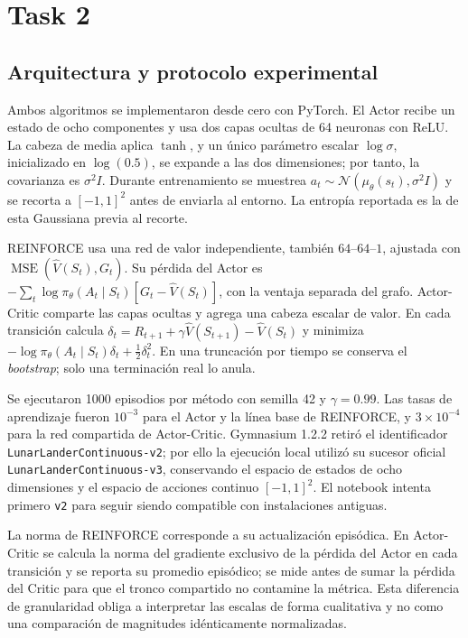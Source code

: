 \documentclass[11pt,letterpaper]{article}
\begin{document}
\section{Task 2}

\subsection{Arquitectura y protocolo experimental}

\begin{respuesta}
Ambos algoritmos se implementaron desde cero con PyTorch. El Actor recibe un estado de
ocho componentes y usa dos capas ocultas de 64 neuronas con ReLU. La cabeza de media
aplica $\tanh$, y un único parámetro escalar $\log\sigma$, inicializado en
$\log(0.5)$, se expande a las dos dimensiones; por tanto, la covarianza es
$\sigma^2I$. Durante entrenamiento se muestrea $a_t\sim\mathcal{N}(\mu_\theta(s_t),
\sigma^2I)$ y se recorta a $[-1,1]^2$ antes de enviarla al entorno. La entropía
reportada es la de esta Gaussiana previa al recorte.

REINFORCE usa una red de valor independiente, también $64$--$64$--$1$, ajustada con
$\operatorname{MSE}(\hat V(S_t),G_t)$. Su pérdida del Actor es
$-\sum_t\log\pi_\theta(A_t\mid S_t)[G_t-\hat V(S_t)]$, con la ventaja separada del
grafo. Actor-Critic comparte las capas ocultas y agrega una cabeza escalar de valor. En
cada transición calcula
$\delta_t=R_{t+1}+\gamma\hat V(S_{t+1})-\hat V(S_t)$ y minimiza
$-\log\pi_\theta(A_t\mid S_t)\delta_t+\tfrac12\delta_t^2$. En una truncación por
tiempo se conserva el \textit{bootstrap}; solo una terminación real lo anula.

Se ejecutaron 1000 episodios por método con semilla 42 y $\gamma=0.99$. Las tasas de
aprendizaje fueron $10^{-3}$ para el Actor y la línea base de REINFORCE, y
$3\times10^{-4}$ para la red compartida de Actor-Critic. Gymnasium 1.2.2 retiró el
identificador \texttt{LunarLanderContinuous-v2}; por ello la ejecución local utilizó su
sucesor oficial \texttt{LunarLanderContinuous-v3}, conservando el espacio de estados de
ocho dimensiones y el espacio de acciones continuo $[-1,1]^2$. El notebook intenta
primero \texttt{v2} para seguir siendo compatible con instalaciones antiguas.

La norma de REINFORCE corresponde a su actualización episódica. En Actor-Critic se
calcula la norma del gradiente exclusivo de la pérdida del Actor en cada transición y se
reporta su promedio episódico; se mide antes de sumar la pérdida del Critic para que el
tronco compartido no contamine la métrica. Esta diferencia de granularidad obliga a
interpretar las escalas de forma cualitativa y no como una comparación de magnitudes
idénticamente normalizadas.
\end{respuesta}
\end{document}

